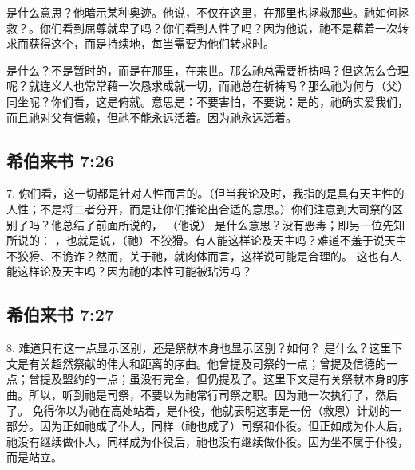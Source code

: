 是什么意思？他暗示某种奥迹。他说，不仅在这里，在那里也拯救那些。祂如何拯救？。你们看到屈尊就卑了吗？你们看到人性了吗？因为他说，祂不是藉着一次转求而获得这个，而是持续地，每当需要为他们转求时。\par

是什么？不是暂时的，而是在那里，在来世。那么祂总需要祈祷吗？但这怎么合理呢？就连义人也常常藉一次恳求成就一切，而祂总在祈祷吗？那么祂为何与（父）同坐呢？你们看，这是俯就。意思是：不要害怕，不要说：是的，祂确实爱我们，而且祂对父有信赖，但祂不能永远活着。因为祂永远活着。\par


\subsection{希伯来书 7:26}

7.  你们看，这一切都是针对人性而言的。（但当我论及时，我指的是具有天主性的人性；不是将二者分开，而是让你们推论出合适的意思。）你们注意到大司祭的区别了吗？他总结了前面所说的，  （他说） 是什么意思？没有恶毒；即另一位先知所说的： ，也就是说，（祂）不狡猾。有人能这样论及天主吗？难道不羞于说天主不狡猾、不诡诈？然而，关于祂，就肉体而言，这样说可能是合理的。 这也有人能这样论及天主吗？因为祂的本性可能被玷污吗？\par


\subsection{希伯来书 7:27}

8. 难道只有这一点显示区别，还是祭献本身也显示区别？如何？  是什么？这里下文是有关超然祭献的伟大和距离的序曲。他曾提及司祭的一点；曾提及信德的一点；曾提及盟约的一点；虽没有完全，但仍提及了。这里下文是有关祭献本身的序曲。所以，听到祂是司祭，不要以为祂常行司祭之职。因为祂一次执行了，然后了。 免得你以为祂在高处站着，是仆役，他就表明这事是一份（救恩）计划的一部分。因为正如祂成了仆人，同样（祂也成了）司祭和仆役。但正如成为仆人后，祂没有继续做仆人，同样成为仆役后，祂也没有继续做仆役。因为坐不属于仆役，而是站立。\par

